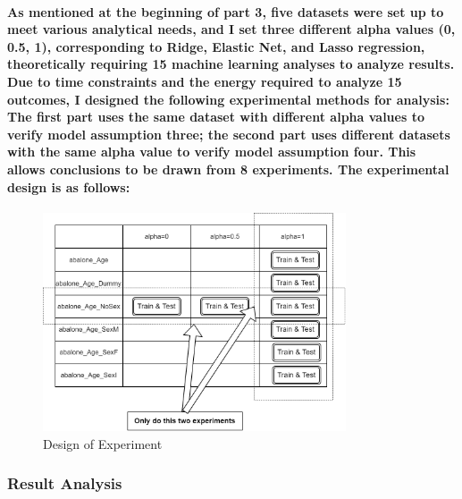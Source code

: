 \documentclass[11pt]{article} %
\begin{document}
\paragraph{As mentioned at the beginning of part 3, five datasets were set up to meet various analytical needs, and I set three different alpha values (0, 0.5, 1), corresponding to Ridge, Elastic Net, and Lasso regression, theoretically requiring 15 machine learning analyses to analyze results. Due to time constraints and the energy required to analyze 15 outcomes, I designed the following experimental methods for analysis: The first part uses the same dataset with different alpha values to verify model assumption three; the second part uses different datasets with the same alpha value to verify model assumption four. This allows conclusions to be drawn from 8 experiments. The experimental design is as follows:}
\begin{figure}[H]
    \centering
    \includegraphics[width=0.8\textwidth]{Pic/DoE.png}
    \caption{Design of Experiment}
\end{figure}
% 
\subsubsection{Result Analysis}
\end{document}
